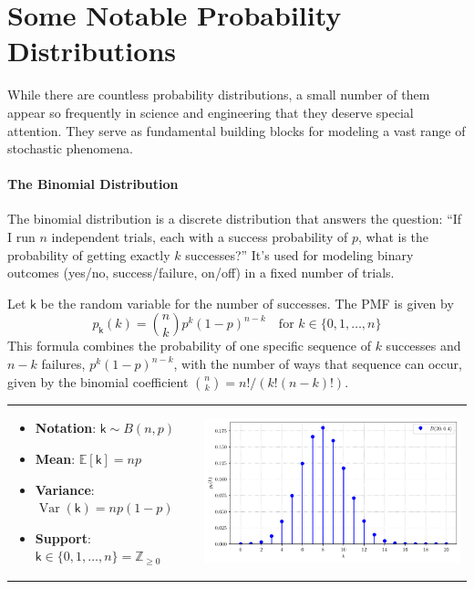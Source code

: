 \section{Some Notable Probability Distributions}
While there are countless probability distributions, a small number of them appear so frequently in science and engineering that they deserve special attention. They serve as fundamental building blocks for modeling a vast range of stochastic phenomena.

\paragraph*{The Binomial Distribution}
The binomial distribution is a discrete distribution that answers the question: ``If I run $n$ independent trials, each with a success probability of $p$, what is the probability of getting exactly $k$ successes?'' It's used for modeling binary outcomes (yes/no, success/failure, on/off) in a fixed number of trials.

Let $\mathsf{k}$ be the random variable for the number of successes. The PMF is given by
\begin{equation}
    p_{\mathsf{k}}(k) = \binom{n}{k} p^k (1-p)^{n-k} \quad \text{for } k \in \{0, 1, \dots, n\}
\end{equation}
This formula combines the probability of one specific sequence of $k$ successes and $n-k$ failures, $p^k(1-p)^{n-k}$, with the number of ways that sequence can occur, given by the binomial coefficient $\binom{n}{k} = n!/(k!(n-k)!)$.

\begin{tabular}{@{}>{\raggedright\arraybackslash}m{} >{\raggedleft\arraybackslash}m{}@{}}
    \begin{itemize}
        \item \textbf{Notation}: $\mathsf{k} \sim B(n, p)$
        \item \textbf{Mean}: $\mathbb{E}[\mathsf{k}] = np$
        \item \textbf{Variance}: $\operatorname{Var}(\mathsf{k}) = np(1-p)$
        \item \textbf{Support}: $\mathsf{k} \in \{0, 1, \dots, n\} = \mathbb{Z}_{\ge 0}$
    \end{itemize}
    &
    \includegraphics[width=\linewidth]{figs/probability/binomial_pmf.pdf} \\
\end{tabular}



